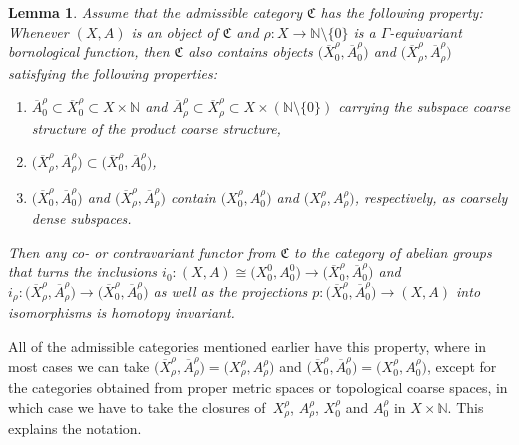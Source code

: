 \documentclass[pdftex]{sigma}
\numberwithin{equation}{section}
\newtheorem{lem}[thm]{Lemma}
\theoremstyle{definition}
\newcommand{\N}{\mathbb{N}}
\newcommand{\admissible}{{\mathfrak{C}}}
\begin{document}
\begin{lem}\label{lem:homotopydomainisomorphismlemma}
Assume that the admissible category $\admissible$ has the following property: Whenever $(X,A)$ is an object of $\admissible$ and $\rho\colon X\to\N\setminus\{0\}$ is a $\Gamma$-equivariant bornological function, then $\admissible$ also contains objects $\big(\overline X_0^\rho,\overline A_0^\rho\big)$ and $\big(\overline X_\rho^\rho,\overline A_\rho^\rho\big)$
satisfying the following properties:
\begin{enumerate}\itemsep=0pt
\item[$\bullet$] $\overline A_0^\rho\subset \overline X_0^\rho\subset X\times\N$ and $\overline A_\rho^\rho\subset \overline X_\rho^\rho\subset X\times(\N\setminus\{0\})$ carrying the subspace coarse structure of the product coarse structure,
\item[$\bullet$] $\big(\overline X_\rho^\rho,\overline A_\rho^\rho\big)\subset\big(\overline X_0^\rho,\overline A_0^\rho\big)$,
\item[$\bullet$] $\big(\overline X_0^\rho,\overline A_0^\rho\big)$ and $\big(\overline X_\rho^\rho,\overline A_\rho^\rho\big)$ contain $\big(X_0^\rho,A_0^\rho\big)$ and $\big(X_\rho^\rho,A_\rho^\rho\big)$, respectively, as coarsely dense subspaces.
\end{enumerate}
Then any co- or contravariant functor from $\admissible$ to the category of abelian groups that turns the inclusions $i_0\colon (X,A)\cong \big(X_0^0,A_0^0\big)\to \big(\overline X_0^\rho,\overline A_0^\rho\big)$ and $i_\rho\colon \big(\overline X_\rho^\rho,\overline A_\rho^\rho\big)\to \big(\overline X_0^\rho,\overline A_0^\rho\big)$ as well as the projections $p\colon \big(\overline X_0^\rho,\overline A_0^\rho\big)\to (X,A)$ into isomorphisms is homotopy invariant.
\end{lem}
All of the admissible categories mentioned earlier have this property, where in most cases we can take $\big(\overline X_\rho^\rho,\overline A_\rho^\rho\big)=\big(X_\rho^\rho,A_\rho^\rho\big)$ and $\big(\overline X_0^\rho,\overline A_0^\rho\big)=\big(X_0^\rho,A_0^\rho\big)$, except for the categories obtained from proper metric spaces or topological coarse spaces, in which case we have to take the closures of~$X_\rho^\rho$, $A_\rho^\rho$, $X_0^\rho$ and $A_0^\rho$ in $X\times\N$. This explains the notation.
\end{document}
